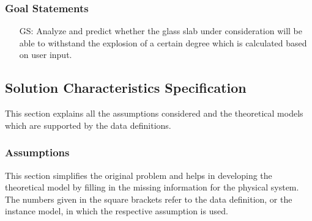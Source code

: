\documentclass[12pt]{article}
\newcounter{goalnum} %
\begin{document}
\subsubsection{Goal Statements}

\begin{itemize}
\item[GS\refstepcounter{goalnum}\thegoalnum:] Analyze and predict whether the
  glass slab under consideration will be able to withstand the explosion of a
  certain degree which is calculated based on user input.
\end{itemize}  

\subsection{Solution Characteristics Specification}

This section explains all the assumptions considered and the theoretical models
which are supported by the data definitions.

\subsubsection{Assumptions} \label{Assumptions}

This section simplifies the original problem and helps in developing the
theoretical model by filling in the missing information for the physical
system. The numbers given in the square brackets refer to the data definition,
or the instance model, in which the respective assumption is used.
\end{document}
